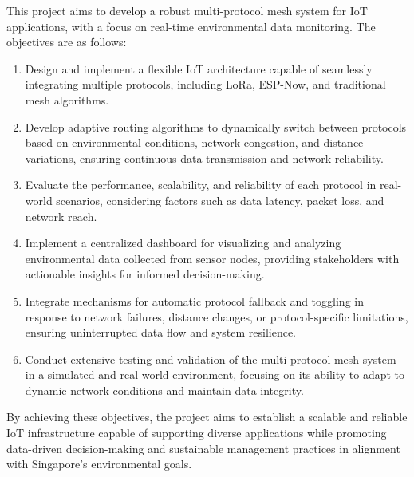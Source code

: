 This project aims to develop a robust multi-protocol mesh system for IoT applications, with a focus on real-time environmental data monitoring. The objectives are as follows:

\begin{enumerate}
    \item Design and implement a flexible IoT architecture capable of seamlessly integrating multiple protocols, including LoRa, ESP-Now, and traditional mesh algorithms.
    \item Develop adaptive routing algorithms to dynamically switch between protocols based on environmental conditions, network congestion, and distance variations, ensuring continuous data transmission and network reliability.
    \item Evaluate the performance, scalability, and reliability of each protocol in real-world scenarios, considering factors such as data latency, packet loss, and network reach.
    \item Implement a centralized dashboard for visualizing and analyzing environmental data collected from sensor nodes, providing stakeholders with actionable insights for informed decision-making.
    \item Integrate mechanisms for automatic protocol fallback and toggling in response to network failures, distance changes, or protocol-specific limitations, ensuring uninterrupted data flow and system resilience.
    \item Conduct extensive testing and validation of the multi-protocol mesh system in a simulated and real-world environment, focusing on its ability to adapt to dynamic network conditions and maintain data integrity.
\end{enumerate}

By achieving these objectives, the project aims to establish a scalable and reliable IoT infrastructure capable of supporting diverse applications while promoting data-driven decision-making and sustainable management practices in alignment with Singapore's environmental goals.




